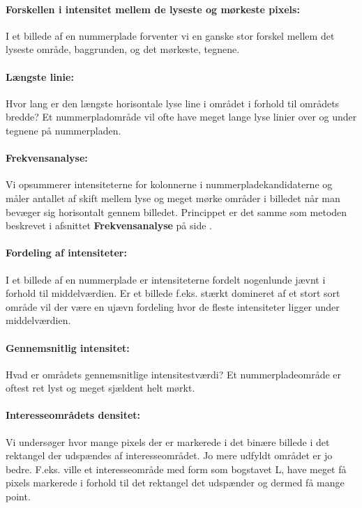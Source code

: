 \paragraph*{Forskellen i intensitet mellem de lyseste og mørkeste pixels:}
I et billede af en nummerplade forventer vi en ganske stor forskel mellem det lyseste område, baggrunden, og det mørkeste, tegnene.

\paragraph*{Længste linie:}
Hvor lang er den længste horisontale lyse line i området i forhold til områdets bredde? Et nummerpladområde vil ofte have meget lange lyse linier over og under tegnene på nummerpladen.

\paragraph*{Frekvensanalyse:}
Vi opsummerer intensiteterne for kolonnerne i nummerpladekandidaterne og måler antallet af skift mellem lyse og meget mørke områder i billedet når man bevæger sig horisontalt gennem billedet. Princippet er det samme som metoden beskrevet i afsnittet \textbf{Frekvensanalyse} på side \pageref{sec:DetectPlateness}. 

\paragraph*{Fordeling af intensiteter:}
I et billede af en nummerplade er intensiteterne fordelt nogenlunde jævnt i forhold til middelværdien. Er et billede f.eks. stærkt domineret af et stort sort område vil der være en ujævn fordeling hvor de fleste intensiteter ligger under middelværdien.

\paragraph*{Gennemsnitlig intensitet:}
Hvad er områdets gennemsnitlige intensitestværdi? Et nummerpladeområde er oftest ret lyst og meget sjældent helt mørkt. 

\paragraph*{Interesseområdets densitet:}
Vi undersøger hvor mange pixels der er markerede i det binære billede i det rektangel der udspændes af interesseområdet. Jo mere udfyldt området er jo bedre. F.eks. ville et interesseområde med form som bogstavet L, have meget få pixels markerede i forhold til det rektangel det udspænder og dermed få mange point.


